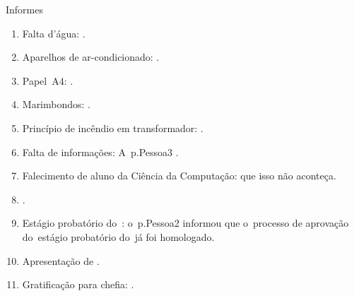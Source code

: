 \documentclass[12pt,a4paper]{ata}
\begin{document}
\begin{ponto}{Informes}

  \begin{enumerate}

  \item Falta d'água: \dummyText.

  \item Aparelhos de ar-condicionado: \dummyText.

  \item Papel~A$4$: \dummyText.

  \item Marimbondos: \dummyText.

  \item Princípio de incêndio em transformador: \dummyText.

  \item Falta de informações: A~\profa \gls{p.Pessoa3} \dummyText.

  \item Falecimento de aluno da Ciência da Computação: que isso não aconteça.

  \item \dummyText. 

  \item Estágio probatório do~\prof: o~\prof \gls{p.Pessoa2} informou que o~processo de aprovação do~estágio probatório do~\prof já foi homologado.

  \item Apresentação de \dummyText.

  \item Gratificação para chefia: \dummyText.

  \end{enumerate}

\end{ponto}

\label{Aprovação em ata}
\end{document}
